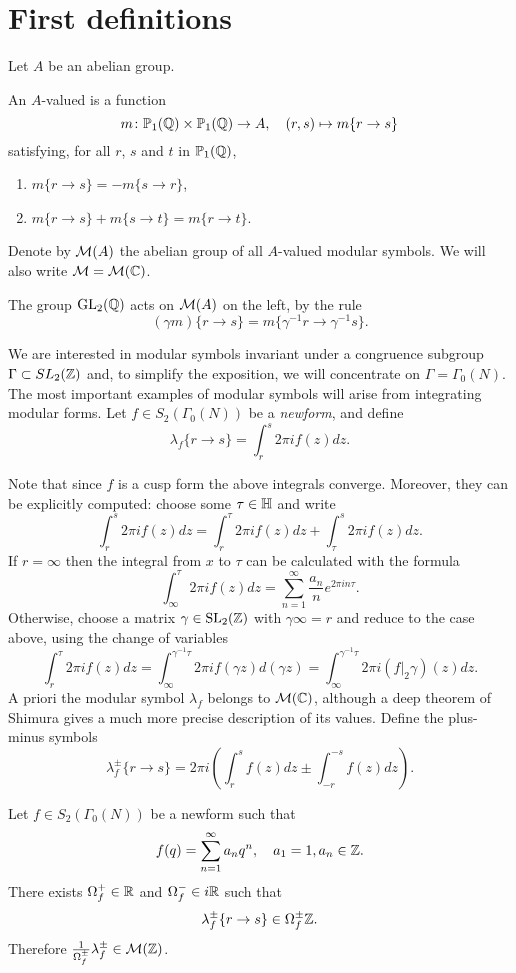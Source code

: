\section{First definitions}
Let $A$ be an abelian group.

\begin{definition}
  An $A$-valued  is a function
\[
m\colon \mathbb{P}_1(\mathbb{Q})\times \mathbb{P}_1(\mathbb{Q}) \to A, \quad (r,s)\mapsto m\{r\to s\}
\]
satisfying, for all $r$, $s$ and $t$ in $\mathbb{P}_1(\mathbb{Q})$,
\begin{enumerate}
  \item $m\{r\to s\} = -m\{s\to r\}$,
  \item $m\{r\to s\} + m\{s\to t\} = m\{r\to t\}$.
\end{enumerate}
Denote by $\mathcal{M}(A)$ the abelian group of all $A$-valued modular symbols. We will also write $\mathcal{M}=\mathcal{M}(\mathbb{C})$.
\end{definition}
The group $\operatorname{GL}_2(\mathbb{Q})$ acts on $\mathcal{M}(A)$ on the left, by the rule
\[
(\gamma m)\{r\to s\} = m\{\gamma^{-1} r\to\gamma^{-1} s\}.
\]

We are interested in modular symbols invariant under a congruence subgroup $\Gamma\subset SL_2(\mathbb{Z})$ and, to simplify the exposition, we will concentrate on $\Gamma=\Gamma_0(N)$. The most important examples of modular symbols will arise
from integrating modular forms. Let $f\in S_2(\Gamma_0(N))$ be a \emph{newform}, and define
\[
\lambda_f \{r\to s\} = \int_r^s 2\pi i f(z) dz.
\]

Note that since $f$ is a cusp form the above integrals converge. Moreover, they can be explicitly computed: choose some $\tau\in\mathbb{H}$ and write
\[
\int_r^s 2\pi i f(z)dz = \int_r^\tau 2\pi i f(z)dz + \int_\tau^s 2\pi i f(z)dz.
\]
If $r=\infty$ then the integral from $x$ to $\tau$ can be calculated with the formula
\[
\int_\infty^\tau 2\pi i f(z)dz=\sum_{n=1}^\infty \frac{a_n}{n} e^{2\pi i n \tau}.
\]
Otherwise, choose a matrix $\gamma\in\operatorname{SL}_2(\mathbb{Z})$ with $\gamma \infty = r$ and reduce to the case above, using the change of variables
\[
\int_r^\tau 2\pi i f(z)dz = \int_\infty^{\gamma^{-1}\tau} 2\pi if(\gamma z)d(\gamma z)=\int_\infty^{\gamma^{-1}\tau} 2\pi i (f|_2\gamma)(z)dz.
\]
A priori the modular symbol $\lambda_f$ belongs to $\mathcal{M}(\mathbb{C})$, although a deep theorem of Shimura gives a much more precise description of its values. Define the plus-minus symbols
\[
\lambda_f^\pm \{r\to s\} = 2\pi i \left(\int_r^s f(z) dz \pm \int_{-r}^{-s} f(z)dz\right).
\]

\begin{theorem}[Shimura]
  Let $f\in S_2(\Gamma_0(N))$ be a newform such that
\[
f(q)=\sum_{n=1}^\infty a_n q^n,\quad a_1=1, a_n\in\mathbb{Z}.
\]
There exists $\Omega_f^+\in\mathbb{R}$ and $\Omega_f^-\in i\mathbb{R}$ such that
\[
\lambda_f^\pm\{r\to s\}\in \Omega_f^\pm\mathbb{Z}.
\]
Therefore $\frac{1}{\Omega_f^\pm}\lambda_f^\pm\in \mathcal{M}(\mathbb{Z})$.
\end{theorem}

